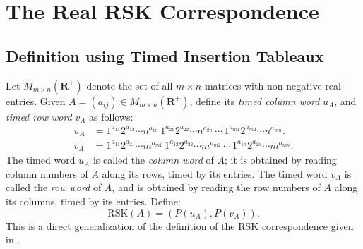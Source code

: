 \documentclass[10pt]{amsproc}
\theoremstyle{definition}
\theoremstyle{remark}
\newcommand{\rp}{\mathbf{R}^+}
\newcommand{\rsk}{\mathrm{RSK}}
\begin{document}
\section{The Real RSK Correspondence}
\label{sec:rsk}
\subsection{Definition using Timed Insertion Tableaux}
\label{sec:defin-using-timed}
Let $M_{m\times n}(\rp)$ denote the set of all $m\times n$ matrices with non-negative real entries.
Given $A=(a_{ij})\in M_{m\times n}(\rp)$, define its \emph{timed column word} $u_A$, and \emph{timed row word} $v_A$ as follows:
\begin{align*}
  u_A & = 1^{a_{11}}2^{a_{12}}\dotsb n^{a_{1n}}\,1^{a_{21}}2^{a_{22}}\dotsb n^{a_{2n}}\,\dotsb \,1^{a_{m1}}2^{a_{m2}}\dotsb n^{a_{mn}}.\\
  v_A & = 1^{a_{11}}2^{a_{21}}\dotsb m^{a_{m1}}\,1^{a_{12}}2^{a_{22}}\dotsb m^{a_{m2}}\,\dotsb \,1^{a_{1n}}2^{a_{2n}}\dotsb m^{a_{mn}}.
\end{align*}
The timed word $u_A$ is called the \emph{column word} of $A$; it is obtained by reading column numbers of $A$ along its rows, timed by its entries.
The timed word $v_A$ is called the \emph{row word} of $A$, and is obtained by reading the row numbers of $A$ along its columns, timed by its entries.
Define:
\begin{equation}
  \label{eq:rsk}
  \rsk(A) = (P(u_A), P(v_A)).
\end{equation}
This is a direct generalization of the definition of the RSK correspondence given in \cite[Section~18]{schur_poly}.
\end{document}
